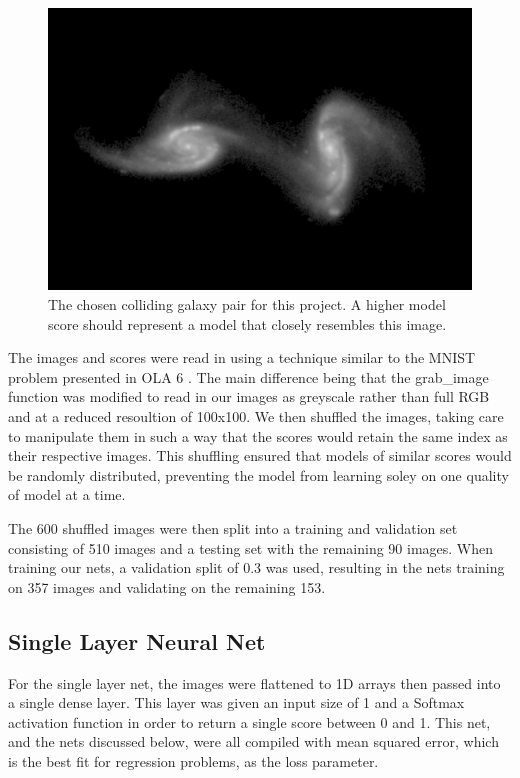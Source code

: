 \documentclass[conference]{IEEEtran}
\begin{document}
\begin{figure}[htbp]
\centerline{\includegraphics[width=0.75\linewidth]{./Images/target.png}}
\caption{The chosen colliding galaxy pair for this project. A higher model score should represent a model that closely resembles this image.}
\label{fig:TargetGalaxy}
\end{figure}

The images and scores were read in using a technique similar to the MNIST problem presented in OLA 6 \cite{phillips}. The main difference being that the grab\_image function was modified to read in our images as greyscale rather than full RGB and at a reduced resoultion of 100x100. We then shuffled the images, taking care to manipulate them in such a way that the scores would retain the same index as their respective images. This shuffling ensured that models of similar scores would be randomly distributed, preventing the model from learning soley on one quality of model at a time. 

The 600 shuffled images were then split into a training and validation set consisting of 510 images and a testing set with the remaining 90 images. When training our nets, a validation split of 0.3 was used, resulting in the nets training on 357 images and validating on the remaining 153.

\subsection{Single Layer Neural Net}

For the single layer net, the images were flattened to 1D arrays then passed into a single dense layer. This layer was given an input size of 1 and a Softmax activation function in order to return a single score between 0 and 1. This net, and the nets discussed below, were all compiled with mean squared error, which is the best fit for regression problems, as the loss parameter.
\end{document}
